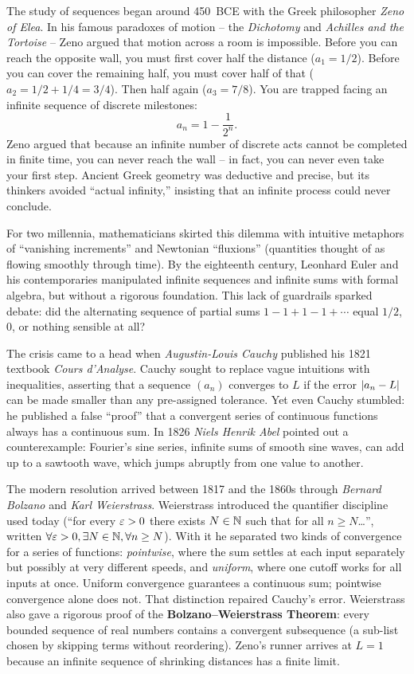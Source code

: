 \begin{historybox}
The study of sequences began around 450~BCE with the Greek philosopher \emph{Zeno of Elea}. In his famous paradoxes of motion -- the \emph{Dichotomy} and \emph{Achilles and the Tortoise} -- Zeno argued that motion across a room is impossible. Before you can reach the opposite wall, you must first cover half the distance ($a_1 = 1/2$). Before you can cover the remaining half, you must cover half of that ($a_2 = 1/2 + 1/4 = 3/4$). Then half again ($a_3 = 7/8$). You are trapped facing an infinite sequence of discrete milestones:
\[
  a_n = 1 - \frac{1}{2^n}.
\]
Zeno argued that because an infinite number of discrete acts cannot be completed in finite time, you can never reach the wall -- in fact, you can never even take your first step. Ancient Greek geometry was deductive and precise, but its thinkers avoided ``actual infinity,'' insisting that an infinite process could never conclude.

For two millennia, mathematicians skirted this dilemma with intuitive metaphors of ``vanishing increments'' and Newtonian ``fluxions'' (quantities thought of as flowing smoothly through time). By the eighteenth century, Leonhard Euler and his contemporaries manipulated infinite sequences and infinite sums with formal algebra, but without a rigorous foundation. This lack of guardrails sparked debate: did the alternating sequence of partial sums $1 - 1 + 1 - 1 + \cdots$ equal $1/2$, $0$, or nothing sensible at all?

The crisis came to a head when \emph{Augustin-Louis Cauchy} published his 1821 textbook \emph{Cours d'Analyse}. Cauchy sought to replace vague intuitions with inequalities, asserting that a sequence $(a_n)$ converges to $L$ if the error $\lvert a_n - L\rvert$ can be made smaller than any pre-assigned tolerance. Yet even Cauchy stumbled: he published a false ``proof'' that a convergent series of continuous functions always has a continuous sum. In 1826 \emph{Niels Henrik Abel} pointed out a counterexample: Fourier's sine series, infinite sums of smooth sine waves, can add up to a sawtooth wave, which jumps abruptly from one value to another.

The modern resolution arrived between 1817 and the 1860s through \emph{Bernard Bolzano} and \emph{Karl Weierstrass}. Weierstrass introduced the quantifier discipline used today (``for every $\varepsilon > 0$ there exists $N \in \mathbb{N}$ such that for all $n \ge N$\dots'', written $\forall \varepsilon > 0, \exists N \in \mathbb{N}, \forall n \ge N$). With it he separated two kinds of convergence for a series of functions: \emph{pointwise}, where the sum settles at each input separately but possibly at very different speeds, and \emph{uniform}, where one cutoff works for all inputs at once. Uniform convergence guarantees a continuous sum; pointwise convergence alone does not. That distinction repaired Cauchy's error. Weierstrass also gave a rigorous proof of the \textbf{Bolzano--Weierstrass Theorem}: every bounded sequence of real numbers contains a convergent subsequence (a sub-list chosen by skipping terms without reordering). Zeno's runner arrives at $L = 1$ because an infinite sequence of shrinking distances has a finite limit.


\end{historybox}
